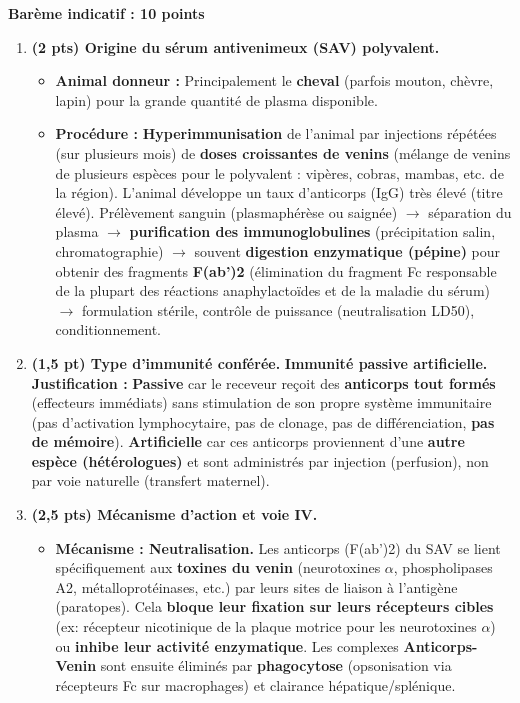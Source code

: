 \documentclass[11pt]{article}
\begin{document}
\begin{corrige}
\textbf{Barème indicatif : 10 points}
\begin{enumerate}
    \item \textbf{(2 pts) Origine du sérum antivenimeux (SAV) polyvalent.}
    \begin{itemize}
        \item \textbf{Animal donneur :} Principalement le \textbf{cheval} (parfois mouton, chèvre, lapin) pour la grande quantité de plasma disponible.
        \item \textbf{Procédure :} \textbf{Hyperimmunisation} de l'animal par injections répétées (sur plusieurs mois) de \textbf{doses croissantes de venins} (mélange de venins de plusieurs espèces pour le polyvalent : vipères, cobras, mambas, etc. de la région). L'animal développe un taux d'anticorps (IgG) très élevé (titre élevé). Prélèvement sanguin (plasmaphérèse ou saignée) $\rightarrow$ séparation du plasma $\rightarrow$ \textbf{purification des immunoglobulines} (précipitation salin, chromatographie) $\rightarrow$ souvent \textbf{digestion enzymatique (pépine)} pour obtenir des fragments \textbf{F(ab')2} (élimination du fragment Fc responsable de la plupart des réactions anaphylactoïdes et de la maladie du sérum) $\rightarrow$ formulation stérile, contrôle de puissance (neutralisation LD50), conditionnement.
    \end{itemize}
    \item \textbf{(1,5 pt) Type d'immunité conférée.}
    \textbf{Immunité \textbf{passive artificielle}.}
    \textbf{Justification :} \textbf{Passive} car le receveur reçoit des \textbf{anticorps tout formés} (effecteurs immédiats) sans stimulation de son propre système immunitaire (pas d'activation lymphocytaire, pas de clonage, pas de différenciation, \textbf{pas de mémoire}). \textbf{Artificielle} car ces anticorps proviennent d'une \textbf{autre espèce (hétérologues)} et sont administrés par injection (perfusion), non par voie naturelle (transfert maternel).
    \item \textbf{(2,5 pts) Mécanisme d'action et voie IV.}
    \begin{itemize}
        \item \textbf{Mécanisme : Neutralisation.} Les anticorps (F(ab')2) du SAV se lient spécifiquement aux \textbf{toxines du venin} (neurotoxines $\alpha$, phospholipases A2, métalloprotéinases, etc.) par leurs sites de liaison à l'antigène (paratopes). Cela \textbf{bloque leur fixation sur leurs récepteurs cibles} (ex: récepteur nicotinique de la plaque motrice pour les neurotoxines $\alpha$) ou \textbf{inhibe leur activité enzymatique}. Les complexes \textbf{Anticorps-Venin} sont ensuite éliminés par \textbf{phagocytose} (opsonisation via récepteurs Fc sur macrophages) et clairance hépatique/splénique.

\end{itemize}
\end{enumerate}
\end{corrige}
\end{document}
